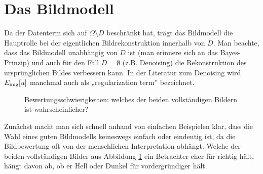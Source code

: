 \documentclass{mythesis}
\begin{document}
\section{Das Bildmodell}

Da der Datenterm sich auf $\Omega \setminus D$ beschränkt hat, trägt das Bildmodell die Hauptrolle bei der eigentlichen Bildrekonstruktion innerhalb von $D$.
Man beachte, dass das Bildmodell unabhängig von $D$ ist (man erinnere sich an das Bayes-Prinzip) und auch für den Fall $D = \emptyset$ (z.B. Denoising) die Rekonstruktion des ursprünglichen Bildes verbessern kann.
In der Literatur zum Denoising wird $E_{\mathrm{img}}[u]$ manchmal auch als „regularization term” bezeichnet.

\begin{figure}[ht]
    \begin{subfigure}[b]{0.33\textwidth}
	\centering
    \end{subfigure}%
    \begin{subfigure}[b]{0.33\textwidth}
	\centering
    \end{subfigure}%
    \begin{subfigure}[b]{0.33\textwidth}
	\centering
    \end{subfigure}
    \caption{Bewertungsschwierigkeiten: welches der beiden vollständigen Bildern ist wahrscheinlicher?}
    \label{fig:inpainting_non_unique}
\end{figure}

Zunächst macht man sich schnell anhand von einfachen Beispielen klar, dass die Wahl eines guten Bildmodells keineswegs einfach oder eindeutig ist, da die Bildbewertung oft von der menschlichen Interpretation abhängt.
Welche der beiden vollständigen Bilder aus Abbildung \ref{fig:inpainting_non_unique} ein Betrachter eher für richtig hält, hängt davon ab, ob er Hell oder Dunkel für vordergründiger hält.
\end{document}
